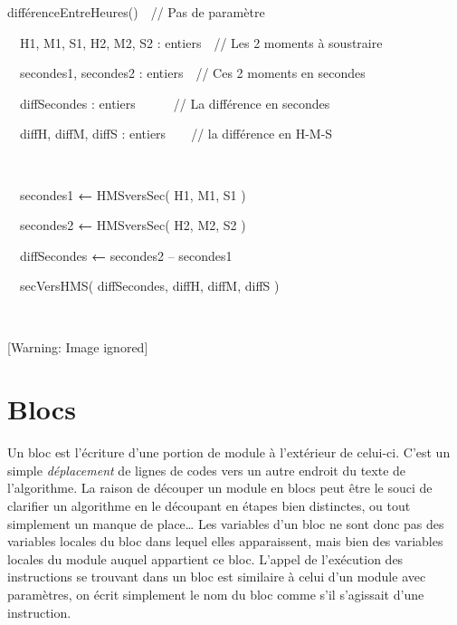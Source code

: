 {\sffamily
{}}


\bigskip

{\bfseries
{}}

{
}

{\sffamily
{} différenceEntreHeures()\ \ // Pas de paramètre}

{\sffamily
{\ \ }{H1, M1, S1, H2,
M2, S2 : entiers\ \ // Les 2 moments à soustraire}}

{\sffamily
\ \ secondes1, secondes2 : entiers\ \ // Ces 2 moments en secondes}

{\sffamily
\ \ diffSecondes : entiers\ \ \ \ \ \ // La différence en secondes}

{\sffamily
\ \ diffH, diffM, diffS : entiers\ \ \ \ // la différence en H-M-S}


\bigskip

{\sffamily
{\ \ }}

{\sffamily
{\ \ secondes1
}{\textbf{←}}{
HMSversSec( H1, M1, S1 )}}

{\sffamily
{\ \ secondes2
}{\textbf{←}}{
HMSversSec( H2, M2, S2 )}}

{\sffamily
{\ \ diffSecondes
}{\textbf{←}}{
secondes2 – secondes1}}

{\sffamily
\ \ secVersHMS( diffSecondes, diffH, diffM, diffS )}

{\sffamily
{\ \ }}


\bigskip

{\sffamily
{}\textstyleMotCl{{\textmd{
}}}}

{\bfseries
{}}

{
}

\begin{center}
 [Warning: Image ignored] %

\end{center}
\section{Blocs}
{
{Un bloc est l’écriture d’une portion de module
à l’extérieur de celui-ci. C’est un simple
}{\textit{déplacement}}{
de lignes de codes vers un autre endroit du texte de
l'algorithme. La raison de découper un module en blocs
peut être le souci de clarifier un algorithme en le découpant en étapes
bien distinctes, ou tout simplement un manque de place… Les variables
d’un bloc ne sont donc pas des variables locales du bloc dans lequel
elles apparaissent, mais bien des variables locales du module auquel
appartient ce bloc. L’appel de l’exécution des instructions se trouvant
dans un bloc est similaire à celui d’un module avec paramètres, on
écrit simplement le nom du bloc comme s’il s’agissait d’une
instruction.}}

